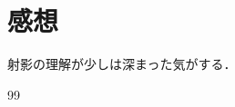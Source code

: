 \documentclass[autodetect-engine,dvi=dvipdfmx,ja=standard,
               a4j,11pt]{bxjsarticle}
\begin{document}



\section{感想}

射影の理解が少しは深まった気がする．

\begin{thebibliography}{99}
\end{thebibliography}

\end{document}
